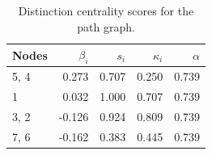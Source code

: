 \begin{table}
\centering
\caption{\label{tab:path}Distinction centrality scores for the path graph.}
\centering
\begin{tabular}[t]{lrrrr}
\toprule
Nodes & $\beta_i$ & $s_i$ & $\kappa_i$ & $\alpha$\\
\midrule
5, 4 & 0.273 & 0.707 & 0.250 & 0.739\\
1 & 0.032 & 1.000 & 0.707 & 0.739\\
3, 2 & -0.126 & 0.924 & 0.809 & 0.739\\
7, 6 & -0.162 & 0.383 & 0.445 & 0.739\\
\bottomrule
\end{tabular}
\end{table}
